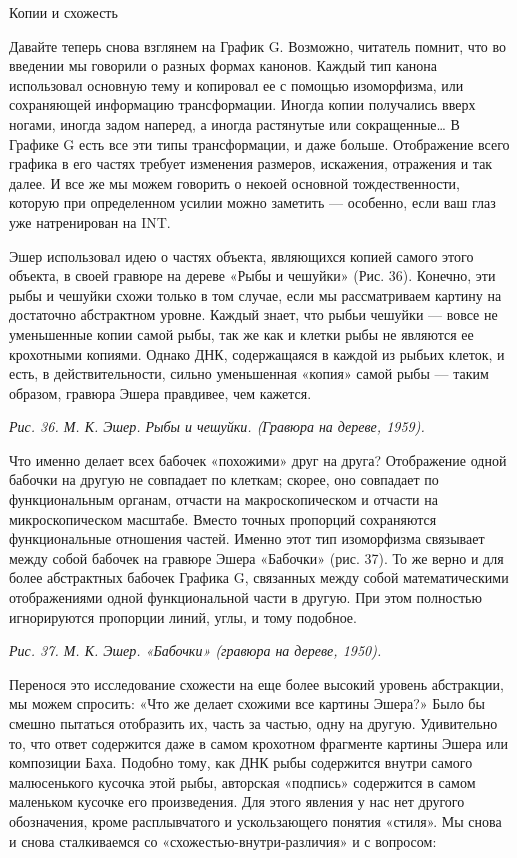 Копии и схожесть

Давайте теперь снова взглянем на График G. Возможно, читатель помнит, что во введении мы говорили о разных формах канонов. Каждый тип канона использовал основную тему и копировал ее с помощью изоморфизма, или сохраняющей информацию трансформации. Иногда копии получались вверх ногами, иногда задом наперед, а иногда растянутые или сокращенные\ldots{} В Графике G есть все эти типы трансформации, и даже больше. Отображение всего графика в его частях требует изменения размеров, искажения, отражения и так далее. И все же мы можем говорить о некоей основной тождественности, которую при определенном усилии можно заметить --- особенно, если ваш глаз уже натренирован на INT.

Эшер использовал идею о частях объекта, являющихся копией самого этого объекта, в своей гравюре на дереве «Рыбы и чешуйки» (Рис. 36). Конечно, эти рыбы и чешуйки схожи только в том случае, если мы рассматриваем картину на достаточно абстрактном уровне. Каждый знает, что рыбьи чешуйки --- вовсе не уменьшенные копии самой рыбы, так же как и клетки рыбы не являются ее крохотными копиями. Однако ДНК, содержащаяся в каждой из рыбьих клеток, и есть, в действительности, сильно уменьшенная «копия» самой рыбы --- таким образом, гравюра Эшера правдивее, чем кажется.

\emph{Рис. 36. М. К. Эшер. Рыбы и чешуйки. (Гравюра на дереве, 1959).}

Что именно делает всех бабочек «похожими» друг на друга? Отображение одной бабочки на другую не совпадает по клеткам; скорее, оно совпадает по функциональным органам, отчасти на макроскопическом и отчасти на микроскопическом масштабе. Вместо точных пропорций сохраняются функциональные отношения частей. Именно этот тип изоморфизма связывает между собой бабочек на гравюре Эшера «Бабочки» (рис. 37). То же верно и для более абстрактных бабочек Графика G, связанных между собой математическими отображениями одной функциональной части в другую. При этом полностью игнорируются пропорции линий, углы, и тому подобное.

\emph{Рис. 37. М. К. Эшер. «Бабочки» (гравюра на дереве, 1950).}

Перенося это исследование схожести на еще более высокий уровень абстракции, мы можем спросить: «Что же делает схожими все картины Эшера?» Было бы смешно пытаться отобразить их, часть за частью, одну на другую. Удивительно то, что ответ содержится даже в самом крохотном фрагменте картины Эшера или композиции Баха. Подобно тому, как ДНК рыбы содержится внутри самого малюсенького кусочка этой рыбы, авторская «подпись» содержится в самом маленьком кусочке его произведения. Для этого явления у нас нет другого обозначения, кроме расплывчатого и ускользающего понятия «стиля». Мы снова и снова сталкиваемся со «схожестью-внутри-различия» и с вопросом:

